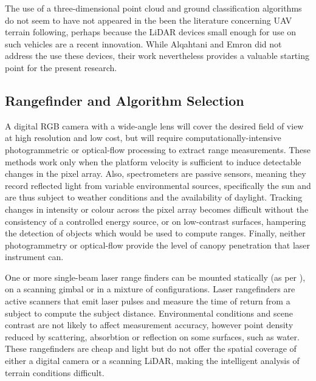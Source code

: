 \documentclass[10pt,a4paper]{report}
\begin{document}
The use of a three-dimensional point cloud and ground classification algorithms do not seem to have not appeared in the been the literature concerning UAV terrain following, perhaps because the LiDAR devices small enough for use on such vehicles are a recent innovation. While Alqahtani and Emron did not address the use these devices, their work nevertheless provides a valuable starting point for the present research. 

\iffalse

*** The power required by the vehicle following any trajectory can be calculated by taking the integral of the function decribing the thrust or power curve. This curve will be something like figure \ref{fig:uav_power_curve}.


\begin{equation}
T_d = \dfrac{v}{\sin(\theta) * E}
\label{eq:decel}
\end{equation} 

\begin{figure}
\centering
\def\svgscale{0.8}

\caption{The power curve of a terrain-following event.}
\label{fig:uav_power_curve}
\end{figure}

\fi

\subsection{Rangefinder and Algorithm Selection}

A digital RGB camera with a wide-angle lens will cover the desired field of view at high resolution and low cost, but will require computationally-intensive photogrammetric or optical-flow processing to extract range measurements. These methods work only when the platform velocity is sufficient to induce detectable changes in the pixel array. Also, spectrometers are passive sensors, meaning they record reflected light from variable environmental sources, specifically the sun and are thus subject to weather conditions and the availability of daylight. Tracking changes in intensity or colour across the pixel array becomes difficult without the consistency of a controlled energy source, or on low-contrast surfaces, hampering the detection of objects which would be used to compute ranges. Finally, neither photogrammetry or optical-flow provide the level of canopy penetration that laser instrument can.

One or more single-beam laser range finders can be mounted statically (as per \cite{Alqahtani2018}), on a scanning gimbal \cite{LightWare2017} or in a mixture of configurations. Laser rangefinders are active scanners that emit laser pulses and measure the time of return from a subject to compute the subject distance. Environmental conditions and scene contrast are not likely to affect measurement accuracy, however point density reduced by scattering, absorbtion or reflection on some surfaces, such as water. These rangefinders are cheap and light but do not offer the spatial coverage of either a digital camera or a scanning LiDAR, making the intelligent analysis of terrain conditions difficult.
\end{document}
